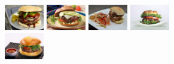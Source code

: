 \documentclass[10pt]{article}
\begin{document}
			\begin{figure}[H]
				\centering
				\begin{subfigure}[b]{1.025\textwidth}
					\includegraphics[width=0.19\textwidth]{images/data/burger/burger28.jpg}
					\includegraphics[width=0.19\textwidth]{images/data/burger/burger77.jpg}
					\includegraphics[width=0.19\textwidth]{images/data/burger/burger89.jpg}
					\includegraphics[width=0.19\textwidth]{images/data/burger/burger162.jpg}
					\includegraphics[width=0.19\textwidth]{images/data/burger/burger449.jpeg}
				\end{subfigure}


\end{figure}
\end{document}
